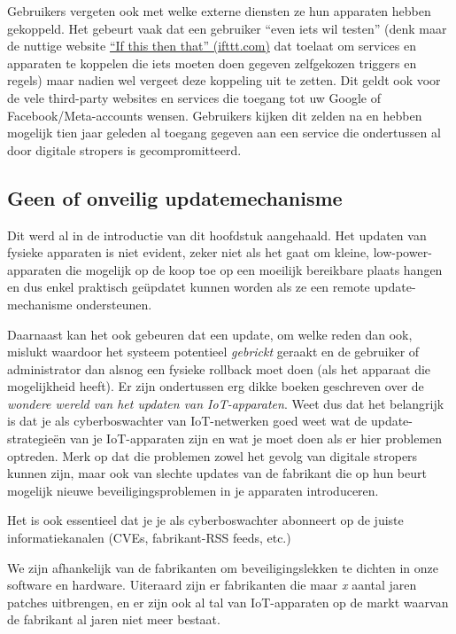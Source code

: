 \documentclass[
  10pt,
  dutch,
  paper=a4,
  ,captions=tableheading
]{scrbook}
\begin{document}
Gebruikers vergeten ook met welke externe diensten ze hun apparaten
hebben gekoppeld. Het gebeurt vaak dat een gebruiker ``even iets wil
testen'' (denk maar de nuttige website \href{https://ifttt.com/}{``If
this then that'' (ifttt.com)} dat toelaat om services en apparaten te
koppelen die iets moeten doen gegeven zelfgekozen triggers en regels)
maar nadien wel vergeet deze koppeling uit te zetten. Dit geldt ook voor
de vele third-party websites en services die toegang tot uw Google of
Facebook/Meta-accounts wensen. Gebruikers kijken dit zelden na en hebben
mogelijk tien jaar geleden al toegang gegeven aan een service die
ondertussen al door digitale stropers is gecompromitteerd.

\subsection{Geen of onveilig
updatemechanisme}\label{geen-of-onveilig-updatemechanisme}

Dit werd al in de introductie van dit hoofdstuk aangehaald. Het updaten
van fysieke apparaten is niet evident, zeker niet als het gaat om
kleine, low-power-apparaten die mogelijk op de koop toe op een moeilijk
bereikbare plaats hangen en dus enkel praktisch geüpdatet kunnen worden
als ze een remote update-mechanisme ondersteunen.

Daarnaast kan het ook gebeuren dat een update, om welke reden dan ook,
mislukt waardoor het systeem potentieel \emph{gebrickt} geraakt en de
gebruiker of administrator dan alsnog een fysieke rollback moet doen
(als het apparaat die mogelijkheid heeft). Er zijn ondertussen erg dikke
boeken geschreven over de \emph{wondere wereld van het updaten van
IoT-apparaten}. Weet dus dat het belangrijk is dat je als
cyberboswachter van IoT-netwerken goed weet wat de update-strategieën
van je IoT-apparaten zijn en wat je moet doen als er hier problemen
optreden. Merk op dat die problemen zowel het gevolg van digitale
stropers kunnen zijn, maar ook van slechte updates van de fabrikant die
op hun beurt mogelijk nieuwe beveiligingsproblemen in je apparaten
introduceren.

\begin{tipblock}
Het is ook essentieel dat je je als cyberboswachter abonneert op de
juiste informatiekanalen (CVEs, fabrikant-RSS feeds, etc.)
\end{tipblock}

We zijn afhankelijk van de fabrikanten om beveiligingslekken te dichten
in onze software en hardware. Uiteraard zijn er fabrikanten die maar
\emph{x} aantal jaren patches uitbrengen, en er zijn ook al tal van
IoT-apparaten op de markt waarvan de fabrikant al jaren niet meer
bestaat.
\end{document}
